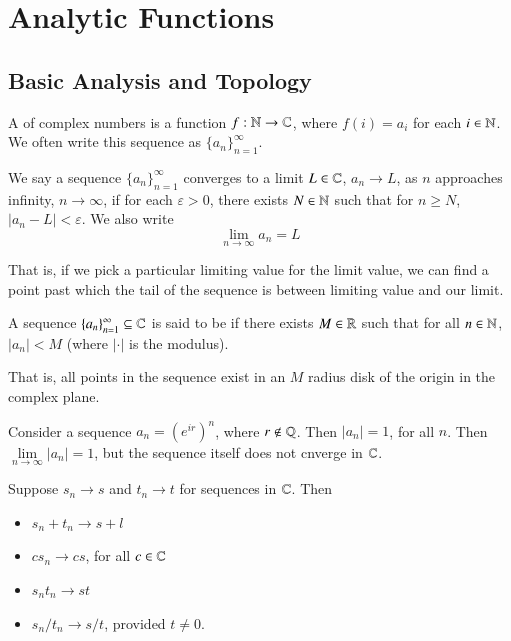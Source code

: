 \documentclass[12pt, a4paper, oneside, openright, titlepage]{book}
\begin{document}
\chapter{Analytic Functions}

\section{Basic Analysis and Topology}


\begin{defn}
    A  of complex numbers is a function $f:\mathbb N\rightarrow \mathbb C$, where $f(i) = a_i$ for each $i \in \mathbb N$. We often write this sequence as $\{a_n\}_{n=1}^{\infty}$.
\end{defn}

\begin{defn}
    We say a sequence $\{a_n\}_{n=1}^{\infty}$ converges to a limit $L \in \mathbb C$, $a_n\rightarrow L$, as $n$ approaches infinity, $n\rightarrow \infty$, if for each $\varepsilon > 0$, there exists $N \in \mathbb N$ such that for $n \geq N$, $|a_n - L| < \varepsilon$. We also write \begin{equation*}
        \lim\limits_{n\rightarrow \infty}a_n = L
    \end{equation*}
\end{defn}

That is, if we pick a particular limiting value for the limit value, we can find a point past which the tail of the sequence is between limiting value and our limit.

\begin{defn}
    A sequence $\{a_n\}_{n=1}^{\infty} \subseteq \mathbb C$ is said to be  if there exists $M \in \mathbb R$ such that for all $n \in \mathbb N$, $|a_n| < M$ (where $|\cdot|$ is the modulus).
\end{defn}

That is, all points in the sequence exist in an $M$ radius disk of the origin in the complex plane. 

\begin{eg}
    Consider a sequence $a_n = (e^{ir})^n$, where $r \notin \mathbb Q$. Then $|a_n| = 1$, for all $n$. Then $\lim\limits_{n\rightarrow \infty}|a_n| = 1$, but the sequence itself does not cnverge in $\mathbb C$.
\end{eg}


\begin{thm}
    Suppose $s_n\rightarrow s$ and $t_n\rightarrow t$ for sequences in $\mathbb C$. Then \begin{itemize}
        \item $s_n+t_n\rightarrow s+l$
        \item $cs_n \rightarrow cs$, for all $c \in \mathbb C$
        \item $s_nt_n \rightarrow st$
        \item $s_n/t_n\rightarrow s/t$, provided $t \neq 0$.
    \end{itemize}
\end{thm}
\end{document}
